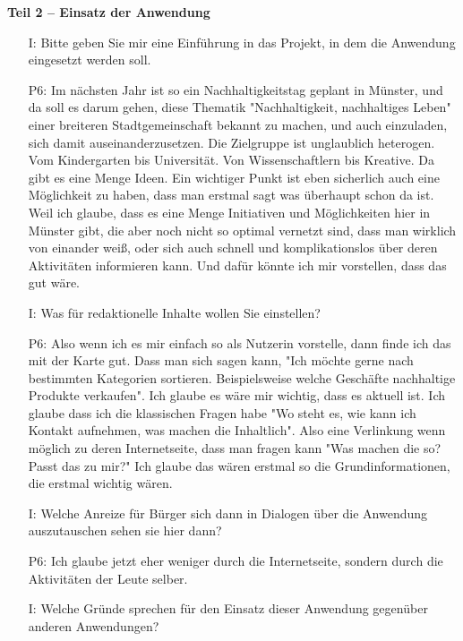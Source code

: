\textbf{Teil 2 -- Einsatz der Anwendung}
\begin{itemize}
    \item[I:] Bitte geben Sie mir eine Einf{\"u}hrung in das Projekt, in dem die Anwendung eingesetzt werden soll.
    \item[P6:] Im n{\"a}chsten Jahr ist so ein Nachhaltigkeitstag geplant in M{\"u}nster, und da soll es darum gehen, diese Thematik "Nachhaltigkeit, nachhaltiges Leben" einer breiteren Stadtgemeinschaft bekannt zu machen, und auch einzuladen, sich damit auseinanderzusetzen. Die Zielgruppe ist unglaublich heterogen. Vom Kindergarten bis Universit{\"a}t. Von Wissenschaftlern bis Kreative. Da gibt es eine Menge Ideen. Ein wichtiger Punkt ist eben sicherlich auch eine M{\"o}glichkeit zu haben, dass man erstmal sagt was {\"u}berhaupt schon da ist. Weil ich glaube, dass es eine Menge Initiativen und M{\"o}glichkeiten hier in M{\"u}nster gibt, die aber noch nicht so optimal vernetzt sind, dass man wirklich von einander wei{\ss}, oder sich auch schnell und komplikationslos {\"u}ber deren Aktivit{\"a}ten informieren kann. Und daf{\"u}r k{\"o}nnte ich mir vorstellen, dass das gut w{\"a}re.
    \item[I:] Was f{\"u}r redaktionelle Inhalte wollen Sie einstellen?
    \item[P6:] Also wenn ich es mir einfach so als Nutzerin vorstelle, dann finde ich das mit der Karte gut. Dass man sich sagen kann, "Ich m{\"o}chte gerne nach bestimmten Kategorien sortieren. Beispielsweise welche Gesch{\"a}fte nachhaltige Produkte verkaufen". Ich glaube es w{\"a}re mir wichtig, dass es aktuell ist. Ich glaube dass ich die klassischen Fragen habe "Wo steht es, wie kann ich Kontakt aufnehmen, was machen die Inhaltlich". Also eine Verlinkung wenn m{\"o}glich zu deren Internetseite, dass man fragen kann "Was machen die so? Passt das zu mir?" Ich glaube das w{\"a}ren erstmal so die Grundinformationen, die erstmal wichtig w{\"a}ren.
    \item[I:] Welche Anreize f{\"u}r B{\"u}rger sich dann in Dialogen {\"u}ber die Anwendung auszutauschen sehen sie hier dann?
    \item[P6:] Ich glaube jetzt eher weniger durch die Internetseite, sondern durch die Aktivit{\"a}ten der Leute selber.
    \item[I:] Welche Gr{\"u}nde sprechen f{\"u}r den Einsatz dieser Anwendung gegen{\"u}ber anderen Anwendungen?

\end{itemize}
